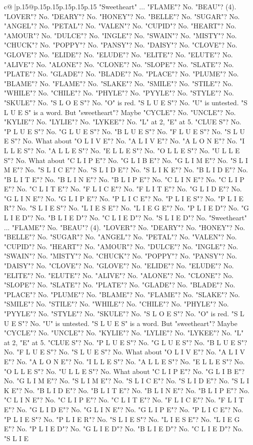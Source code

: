 \documentclass{article}
\begin{document}
{\begin{supertabular}{c@{$\;$}|p{.15\linewidth}@{}p{.15\linewidth}p{.15\linewidth}p{.15\linewidth}p{.15\linewidth}p{.15\linewidth}}
{{{"Sweetheart" ... "FLAME"? No. "BEAU"? (4). "LOVER"? No. "DEARY"? No. "HONEY"? No. "BELLE"? No. "SUGAR"? No. "ANGEL"? No. "PETAL"? No. "VALEN"? No. "CUPID"? No. "HEART"? No. "AMOUR"? No. "DULCE"? No. "INGLE"? No. "SWAIN"? No. "MISTY"? No. "CHUCK"? No. "POPPY"? No. "PANSY"? No. "DAISY"? No. "CLOVE"? No. "GLOVE"? No. "ELIDE"? No. "ELUDE"? No. "ELITE"? No. "ELUTE"? No. "ALIVE"? No. "ALONE"? No. "CLONE"? No. "SLOPE"? No. "SLATE"? No. "PLATE"? No. "GLADE"? No. "BLADE"? No. "PLACE"? No. "PLUME"? No. "BLAME"? No. "FLAME"? No. "SLAKE"? No. "SMILE"? No. "STILE"? No. "WHILE"? No. "CHILE"? No. "PHYLE"? No. "PYYLE"? No. "STYLE"? No. "SKULE"? No. "S L O E S"? No. "O" is red. "S L U E S"? No. "U" is untested. "S L U E S" is a word. But "sweetheart"? Maybe "CYCLE"? No. "UNCLE"? No. "KYLIE"? No. "LYLIE"? No. "LYKEE"? No. "L" at 2, "E" at 5. "CLUE S"? No. "P L U E S"? No. "G L U E S"? No. "B L U E S"? No. "F L U E S"? No. "S L U E S"? No. What about "O L I V E"? No. "A L I V E"? No. "A L O N E"? No. "I L L E S"? No. "A L L E S"? No. "E L L E S"? No. "O L L E S"? No. "U L L E S"? No. What about "C L I P E"? No. "G L I B E"? No. "G L I M E"? No. "S L I M E"? No. "S L I C E"? No. "S L I D E"? No. "S L I K E"? No. "B L I D E"? No. "B L I T E"? No. "B L I N E"? No. "B L I P E"? No. "C L I N E"? No. "C L I P E"? No. "C L I T E"? No. "F L I C E"? No. "F L I T E"? No. "G L I D E"? No. "G L I N E"? No. "G L I P E"? No. "P L I C E"? No. "P L I E S"? No. "P L I E R"? No. "S L I E S"? No. "L I E S E"? No. "L I E G E"? No. "P L I E D"? No. "G L I E D"? No. "B L I E D"? No. "C L I E D"? No. "S L I E D"? No. "Sweetheart" ... "FLAME"? No. "BEAU"? (4). "LOVER"? No. "DEARY"? No. "HONEY"? No. "BELLE"? No. "SUGAR"? No. "ANGEL"? No. "PETAL"? No. "VALEN"? No. "CUPID"? No. "HEART"? No. "AMOUR"? No. "DULCE"? No. "INGLE"? No. "SWAIN"? No. "MISTY"? No. "CHUCK"? No. "POPPY"? No. "PANSY"? No. "DAISY"? No. "CLOVE"? No. "GLOVE"? No. "ELIDE"? No. "ELUDE"? No. "ELITE"? No. "ELUTE"? No. "ALIVE"? No. "ALONE"? No. "CLONE"? No. "SLOPE"? No. "SLATE"? No. "PLATE"? No. "GLADE"? No. "BLADE"? No. "PLACE"? No. "PLUME"? No. "BLAME"? No. "FLAME"? No. "SLAKE"? No. "SMILE"? No. "STILE"? No. "WHILE"? No. "CHILE"? No. "PHYLE"? No. "PYYLE"? No. "STYLE"? No. "SKULE"? No. "S L O E S"? No. "O" is red. "S L U E S"? No. "U" is untested. "S L U E S" is a word. But "sweetheart"? Maybe "CYCLE"? No. "UNCLE"? No. "KYLIE"? No. "LYLIE"? No. "LYKEE"? No. "L" at 2, "E" at 5. "CLUE S"? No. "P L U E S"? No. "G L U E S"? No. "B L U E S"? No. "F L U E S"? No. "S L U E S"? No. What about "O L I V E"? No. "A L I V E"? No. "A L O N E"? No. "I L L E S"? No. "A L L E S"? No. "E L L E S"? No. "O L L E S"? No. "U L L E S"? No. What about "C L I P E"? No. "G L I B E"? No. "G L I M E"? No. "S L I M E"? No. "S L I C E"? No. "S L I D E"? No. "S L I K E"? No. "B L I D E"? No. "B L I T E"? No. "B L I N E"? No. "B L I P E"? No. "C L I N E"? No. "C L I P E"? No. "C L I T E"? No. "F L I C E"? No. "F L I T E"? No. "G L I D E"? No. "G L I N E"? No. "G L I P E"? No. "P L I C E"? No. "P L I E S"? No. "P L I E R"? No. "S L I E S"? No. "L I E S E"? No. "L I E G E"? No. "P L I E D"? No. "G L I E D"? No. "B L I E D"? No. "C L I E D"? No. "S L I E }}}
\end{supertabular}}
\end{document}
